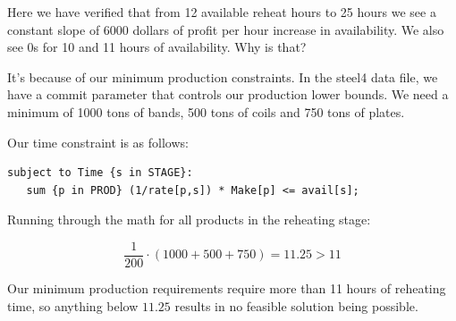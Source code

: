Here we have verified that from 12 available reheat hours to 25 hours we see a constant slope of 6000 dollars of profit per hour increase in availability. We also see 0s for 10 and 11 hours of availability. Why is that?

It's because of our minimum production constraints. In the steel4 data file, we have a commit parameter that controls our production lower bounds. We need a minimum of 1000 tons of bands, 500 tons of coils and 750 tons of plates.

Our time constraint is as follows:

\begin{lstlisting}
subject to Time {s in STAGE}:
   sum {p in PROD} (1/rate[p,s]) * Make[p] <= avail[s];
\end{lstlisting}

Running through the math for all products in the reheating stage:

\[
	\frac{1}{200} \cdot (1000 + 500 + 750) = 11.25 > 11
\]

Our minimum production requirements require more than 11 hours of reheating time, so anything below $11.25$ results in no feasible solution being possible. 
